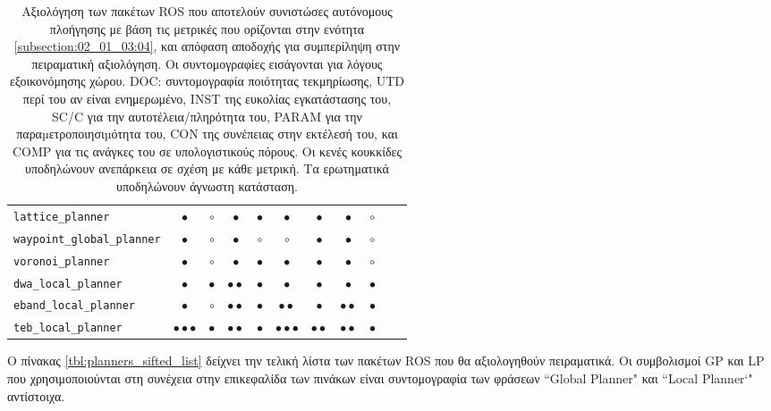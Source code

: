 \begin{table*}
\begin{tabular}{lccccccccc|c}
  \texttt{lattice\_planner}          & $\bullet$                 & $\circ$     & $\bullet$         & $\bullet$ & $\bullet$               & $\bullet$        & $\bullet$               & $\circ$      \\
  \texttt{waypoint\_global\_planner} & $\bullet$                 & $\circ$     & $\bullet$         & $\circ$   & $\circ$                 & $\bullet$        & $\bullet$               & $\circ$      \\
  \texttt{voronoi\_planner}          & $\bullet$                 & $\circ$     & $\bullet$         & $\bullet$ & $\bullet$               & $\bullet$        & $\bullet$               & $\circ$      \\ \midrule
  \texttt{dwa\_local\_planner}       & $\bullet$                 & $\bullet$   & $\bullet\bullet$  & $\bullet$ & $\bullet$               & $\bullet$        & $\bullet$               & $\bullet$    \\
  \texttt{eband\_local\_planner}     & $\bullet$                 & $\circ$     & $\bullet\bullet$  & $\bullet$ & $\bullet\bullet$        & $\bullet$        & $\bullet\bullet$        & $\bullet$    \\
  \texttt{teb\_local\_planner}       & $\bullet\bullet\bullet$   & $\bullet$   & $\bullet\bullet$  & $\bullet$ & $\bullet\bullet\bullet$ & $\bullet\bullet$ & $\bullet\bullet$        & $\bullet$    \\ \bottomrule
\end{tabular}
\caption{\small Αξιολόγηση των πακέτων ROS που αποτελούν συνιστώσες αυτόνομους
         πλοήγησης με βάση τις μετρικές που ορίζονται στην ενότητα
         \ref{subsection:02_01_03:04}, και απόφαση αποδοχής για συμπερίληψη στην
         πειραματική αξιολόγηση. Οι συντομογραφίες εισάγονται για λόγους
         εξοικονόμησης χώρου. DOC: συντομογραφία ποιότητας τεκμηρίωσης, UTD
         περί του αν είναι ενημερωμένο, INST της ευκολίας εγκατάστασης του,
         SC/C για την αυτοτέλεια/πληρότητα του, PARAM για την
         παραµετροποιησιµότητα του, CON της συνέπειας στην εκτέλεσή του, και COMP
         για τις ανάγκες του σε υπολογιστικούς πόρους. Οι κενές κουκκίδες
         υποδηλώνουν ανεπάρκεια σε σχέση με κάθε μετρική. Τα ερωτηματικά
         υποδηλώνουν άγνωστη κατάσταση.}
\label{tbl:qualitative_metrics}
\end{table*}

Ο πίνακας \ref{tbl:planners_sifted_list} δείχνει την τελική λίστα των πακέτων
ROS που θα αξιολογηθούν πειραματικά. Οι συμβολισμοί GP και LP που
χρησιμοποιούνται στη συνέχεια στην επικεφαλίδα των πινάκων είναι συντομογραφία
των φράσεων ``Global Planner" και ``Local Planner`" αντίστοιχα.

